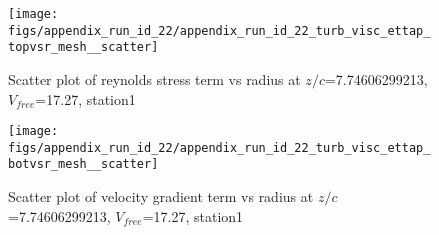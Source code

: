 \begin{figure}[H]
\centering
\texttt{[image: figs/appendix\_run\_id\_22/appendix\_run\_id\_22\_turb\_visc\_ettap\_topvsr\_mesh\_\_scatter]}
\caption{Scatter plot of reynolds stress term vs radius at $z/c$=7.74606299213, $V_{free}$=17.27, station1}
\label{fig:appendix_run_id_22_turb_visc_ettap_topvsr_mesh__scatter}
\end{figure}


\begin{figure}[H]
\centering
\texttt{[image: figs/appendix\_run\_id\_22/appendix\_run\_id\_22\_turb\_visc\_ettap\_botvsr\_mesh\_\_scatter]}
\caption{Scatter plot of velocity gradient term vs radius at $z/c$=7.74606299213, $V_{free}$=17.27, station1}
\label{fig:appendix_run_id_22_turb_visc_ettap_botvsr_mesh__scatter}
\end{figure}


